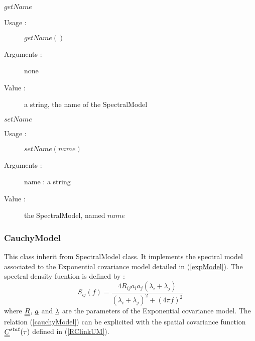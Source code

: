 \begin{description}
\begin{description}
  \item $getName$
    \begin{description}
    \item[Usage :] $getName()$
    \item[Arguments :] none
    \item[Value :] a string, the name of the SpectralModel
    \end{description}
    \bigskip

  \item $setName$
    \begin{description}
    \item[Usage :] $setName(name)$
    \item[Arguments :] name : a string
    \item[Value :] the SpectralModel, named $name$
    \end{description}
    \bigskip

  \end{description}

\end{description}

\newpage \subsubsection{CauchyModel}
\label{cauchyMod}

This class inherit from SpectralModel class. It implements the spectral model associated to the Exponential covariance model detailed in (\ref{expModel}). The spectral density fucntion is defined by : 
\begin{equation}\label{cauchyModelUM}
  S_{ij}(f) = \displaystyle \frac{4R_{ij}a_ia_j(\lambda_i+ \lambda_j)}{(\lambda_i+ \lambda_j)^2 + (4\pi f)^2}
\end{equation}
where ${\underline{\underline{R}}}$, ${\underline{a}}$ and ${\underline{\lambda}}$ are the parameters of the Exponential covariance model. The relation (\ref{cauchyModel}) can be explicited with the spatial covariance function  ${\underline{\underline{C}}}^{stat}(\tau)$ defined in (\ref{RClinkUM}).
 


